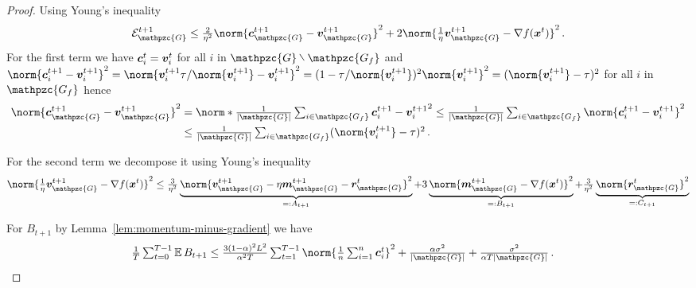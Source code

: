 \documentclass{article}
\newcommand{\gset}{\ensuremath{{\mathpzc{G}}}}
\newcommand{\gfset}{\ensuremath{{\mathpzc{G_f}}}}
\begin{document}
\begin{proof}
Using Young's inequality 
  \[
    \cE_\gset^{t+1} 
     \le 
    \tfrac{2}{\eta^2} \norm{ \cc_\gset^{t+1} - \vv_\gset^{t+1} }^2
    + 2 \norm{ \tfrac{1}{\eta} \vv_\gset^{t+1} - \nabla f(\xx^t) }^2 \, .
  \]
  For the first term we have $\bm{c}_i^t = \bm{v}_i^t$ for all $i$ in $\gset \rsetminus \gfset$ and $\norm{\cc_i^{t+1} - \vv_i^{t+1}}^2 = \norm{\vv_i^{t+1} \tau/\norm{\vv_i^{t+1}} - \vv_i^{t+1}}^2 = (1-\tau/\norm{\vv_i^{t+1}})^2 \norm{\vv_i^{t+1}}^2 = (\norm{\vv_i^{t+1}} - \tau)^2$ for all $i$ in $\gfset$ hence
  \begin{align*}
    \norm{ \cc_\gset^{t+1} - \vv_\gset^{t+1} }^2
     &=
    \norm*{ \tfrac{1}{|\gset|} \tsum_{i\in\gfset} \cc_i^{t+1} - \vv_i^{t+1} }^2
     \le 
    \tfrac{1}{|\gset|} \tsum_{i\in\gfset} \norm{ \cc_i^{t+1} - \vv_i^{t+1} }^2
    \\
     &\le 
    \tfrac{1}{|\gset|} \tsum_{i\in\gfset} (\norm{ \vv_i^{t+1} } - \tau)^2 \, .
  \end{align*}
  
  For the second term we decompose it using Young's inequality
\begin{align*}   
  \norm{ \tfrac{1}{\eta} \vv_\gset^{t+1} - \nabla f(\xx^t) }^2
  \le 
  \tfrac{3}{\eta^2} \underbrace{ \norm{ \vv_\gset^{t+1} - \eta \mm_\gset^{t+1} - \bm r_\gset^t }^2 }_{=: A_{t+1}}
  + 3 \underbrace{ \norm{ \mm_\gset^{t+1} - \nabla f(\xx^t)}^2 }_{=: B_{t+1}}
  + \tfrac{3}{\eta^2} \underbrace{ \norm{ \bm r_\gset^t }^2 }_{=: C_{t+1}}
\end{align*}

For $B_{t+1}$ by Lemma~\ref{lem:momentum-minus-gradient} we have
\begin{align*}
  \tfrac{1}{T} \tsum_{t=0}^{T-1} \E B_{t+1}
   & \le 
  \tfrac{3(1-\alpha)^2 L^2}{\alpha^2T} \tsum_{t=1}^{T-1}
  \norm{ \tfrac{1}{n} \tsum_{i=1}^n \cc_i^t }^2
  + \tfrac{\alpha\sigma^2}{|\gset|} + \tfrac{\sigma^2}{\alpha T|\gset|} \, .
\end{align*}


\end{proof}
\end{document}
